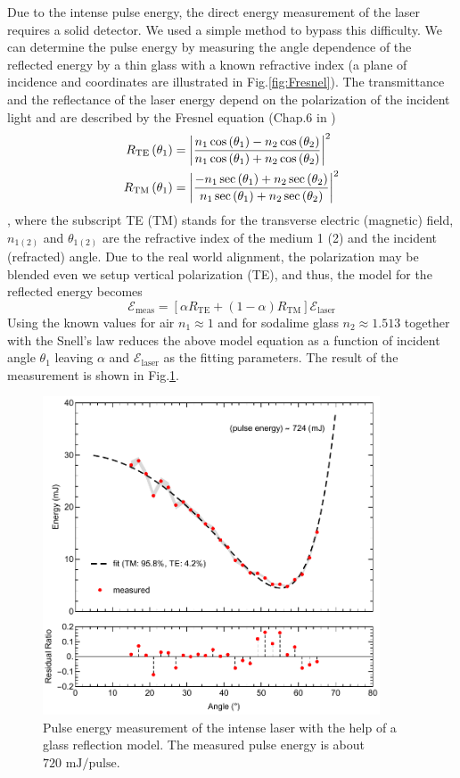 Due to the intense pulse energy, the direct energy measurement of the laser requires a solid detector. We used a simple method to bypass this difficulty. We can determine the pulse energy by measuring the angle dependence of the reflected energy by a thin glass with a known refractive index (a plane of incidence and coordinates are illustrated in Fig.\ref{fig:Fresnel}). The transmittance and the reflectance of the laser energy depend on the polarization of the incident light and are described by the Fresnel equation (Chap.6 in \cite{saleh2019fundamentals})
\begingroup
\allowdisplaybreaks
\begin{align}
R_\text{TE} \left( \theta_1 \right) &= \abs{ \frac{n_1 \cos \left( \theta_1 \right) - n_2 \cos \left( \theta_2 \right)}{n_1 \cos \left( \theta_1 \right) + n_2 \cos \left( \theta_2 \right)} }^2 \\
R_\text{TM} \left( \theta_1 \right) &= \abs{ \frac{ - n_1 \sec \left( \theta_1 \right) + n_2 \sec \left( \theta_2 \right)}{n_1 \sec \left( \theta_1 \right) + n_2 \sec \left( \theta_2 \right)} }^2
\end{align}
\endgroup
, where the subscript TE (TM) stands for the transverse electric (magnetic) field, $n_{1(2)}$ and $\theta_{1(2)}$ are the refractive index of the medium 1 (2) and the incident (refracted) angle. Due to the real world alignment, the polarization may be blended even we setup vertical polarization (TE), and thus, the model for the reflected energy becomes
\begin{equation}
\mathcal{E}_\text{meas} = \left[ \alpha R_\text{TE} + \left( 1-\alpha \right) R_\text{TM} \right] \mathcal{E}_\text{laser}
\end{equation}
Using the known values for air $n_1 \approx 1$ and for sodalime glass $n_2 \approx 1.513$ together with the Snell's law reduces the above model equation as a function of incident angle $\theta_1$ leaving $\alpha$ and $\mathcal{E}_\text{laser}$ as the fitting parameters. The result of the measurement is shown in Fig.\ref{fig:pulseEnergy}.

\begin{figure}[ht!]
\centering
\includegraphics[width=100mm]{figures/ap5/pulse/energy.pdf}
\caption{Pulse energy measurement of the intense laser with the help of a glass reflection model. The measured pulse energy is about $720 \text{ mJ/pulse}$.}
\label{fig:pulseEnergy}
\end{figure}


